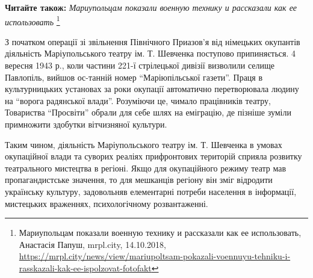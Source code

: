 \textbf{Читайте також:} \emph{Мариупольцам показали военную технику и рассказали как ее использовать}%
\footnote{Мариупольцам показали военную технику и рассказали как ее использовать, Анастасія Папуш, mrpl.city, 14.10.2018, \url{https://mrpl.city/news/view/mariupoltsam-pokazali-voennuyu-tehniku-i-rasskazali-kak-ee-ispolzovat-fotofakt}}

З початком операції зі звільнення Північного Приазов'я від німецьких окупантів
діяльність Маріупольського театру ім. Т. Шевченка поступово припиняється. 4
вересня 1943 р., коли частини 221-ї стрілецької дивізії визволили селище
Павлопіль, вийшов ос\hyp{}танній номер \enquote{Маріюпільської газети}. Праця в
культурницьких установах за роки окупації автоматично перетворювала людину на
\enquote{ворога радянської влади}. Розуміючи це, чимало працівників театру, Товариства
\enquote{Просвіти} обрали для себе шлях на еміграцію, де пізніше зуміли примножити
здобутки вітчизняної культури.

Таким чином, діяльність Маріупольського театру ім. Т.  Шевченка в умовах
окупаційної влади та суворих реаліях прифронтових територій сприяла розвитку
театрального мистецтва в регіоні. Якщо для окупаційного режиму театр мав
пропагандистське значення, то для мешканців регіону він зміг відродити
українську культуру, задовольняв елементарні потреби населення в інформації,
мистецьких враженнях, психологічному розвантаженні.
